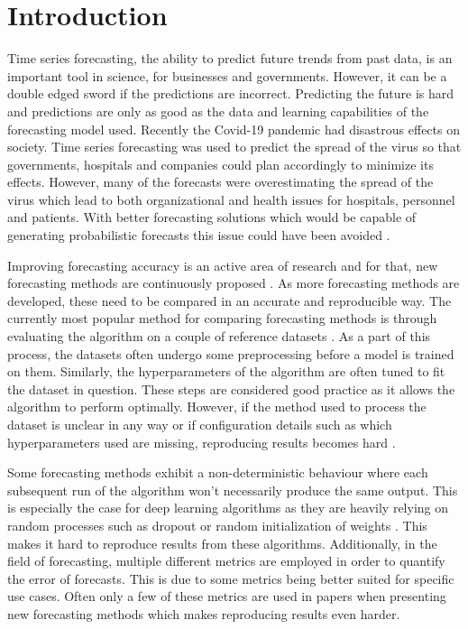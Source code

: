 \chapter{Introduction\label{cha:chapter1}}
Time series forecasting, the ability to predict future trends from past data, is an important tool in science, for businesses and governments. However, it can be a double edged sword if the predictions are incorrect. Predicting the future is hard and predictions are only as good as the data and learning capabilities of the forecasting model used. Recently the Covid-19 pandemic had disastrous effects on society. Time series forecasting was used to predict the spread of the virus so that governments, hospitals and companies could plan accordingly to minimize its effects. However, many of the forecasts were overestimating the spread of the virus which lead to both organizational and health issues for hospitals, personnel and patients. With better forecasting solutions which would be capable of generating probabilistic forecasts this issue could have been avoided \cite{IOANNIDIS2020}.

Improving forecasting accuracy is an active area of research and for that, new forecasting methods are continuously proposed \cite{salinas_deepar_2019,rangapuram_deep_2018,oord_wavenet_2016,oreshkin_n_beats_2020,salinas_high-dimensional_2019}. As more forecasting methods are developed, these need to be compared in an accurate and reproducible way. The currently most popular method for comparing forecasting methods is through evaluating the algorithm on a couple of reference datasets \cite{hyndman_forecasting_3rd}. As a part of this process, the datasets often undergo some preprocessing before a model is trained on them. Similarly, the hyperparameters of the algorithm are often tuned to fit the dataset in question. These steps are considered good practice as it allows the algorithm to perform optimally. However, if the method used to process the dataset is unclear in any way or if configuration details such as which hyperparameters used are missing, reproducing results becomes hard \cite{makridakis_m4_2020}.

Some forecasting methods exhibit a non-deterministic behaviour where each subsequent run of the algorithm won’t necessarily produce the same output. This is especially the case for deep learning algorithms as they are heavily relying on random processes such as dropout or random initialization of weights \cite{srivastava_dropout_2014}. This makes it hard to reproduce results from these algorithms. Additionally, in the field of forecasting, multiple different metrics are employed in order to quantify the error of forecasts. This is due to some metrics being better suited for specific use cases. Often only a few of these metrics are used in papers when presenting new forecasting methods which makes reproducing results even harder.

